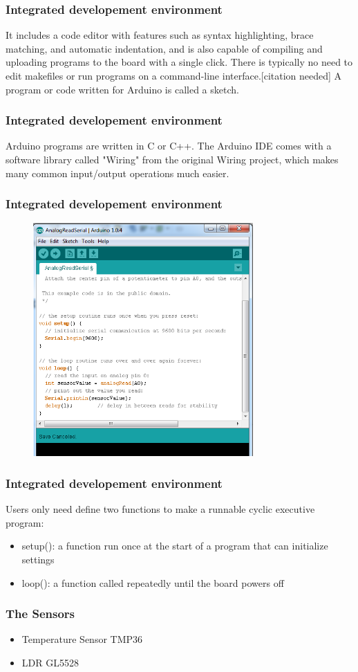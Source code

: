 \documentclass{beamer}
\begin{document}
\frame
{
	\frametitle{Integrated developement environment}
	It includes a code editor with features such as syntax highlighting, brace matching, and automatic indentation, and is also capable of compiling and uploading programs to the board with a single click. There is typically no need to edit makefiles or run programs on a command-line interface.[citation needed] A program or code written for Arduino is called a sketch.
}

\frame
{
	\frametitle{Integrated developement environment}
	Arduino programs are written in C or C++. The Arduino IDE comes with a software library called "Wiring" from the original Wiring project, which makes many common input/output operations much easier. 
}

\frame
{
	\frametitle{Integrated developement environment}
	\begin{figure}	
	\includegraphics[width=0.75\textwidth]{../Images/IDE.png}
	\end{figure}
}

\frame
{
	\frametitle{Integrated developement environment}
Users only need define two functions to make a runnable cyclic executive program:	
	\begin{itemize}
	\item setup(): a function run once at the start of a program that can initialize settings
    \item loop(): a function called repeatedly until the board powers off
	\end{itemize}
}

\frame
{
	\frametitle{The Sensors}
	\begin{itemize}
	\item Temperature Sensor TMP36
	\item LDR GL5528
	\end{itemize}
}
\end{document}
